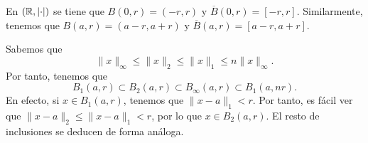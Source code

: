 \begin{eg}
\begin{enumerate}
\begin{center}
\end{center}
	
\end{enumerate}
\end{eg}
\begin{observation}
	En $\displaystyle \left(\mathbb{R}, \left| \cdot \right|\right) $ se tiene que $\displaystyle B\left(0,r\right) = \left(-r,r\right) $ y $\displaystyle \overline{B}\left(0,r\right) = \left[-r,r\right]  $. Similarmente, tenemos que $\displaystyle B\left(a,r\right) = \left(a-r, a + r\right) $ y $\displaystyle \overline{B}\left(a,r\right) = \left[a - r, a + r\right]  $.
\end{observation}
\begin{observation}
Sabemos que 
\[\|x\|_{\infty} \leq \|x\|_{2} \leq \|x\|_{1} \leq n \|x\|_{\infty} .\]
Por tanto, tenemos que 
\[B_{1}\left(a,r\right) \subset B_{2}\left(a,r\right) \subset B_{\infty}\left(a,r\right) \subset B_{1}\left(a, nr\right)  .\]
En efecto, si $\displaystyle x \in B_{1} \left(a,r\right) $, tenemos que $\displaystyle \|x - a\|_{1} < r $. Por tanto, es fácil ver que $\displaystyle \|x - a\|_{2} \leq \|x - a\|_{1} < r $, por lo que $\displaystyle x \in B_{2}\left(a,r\right) $. El resto de inclusiones se deducen de forma análoga.
\end{observation}
